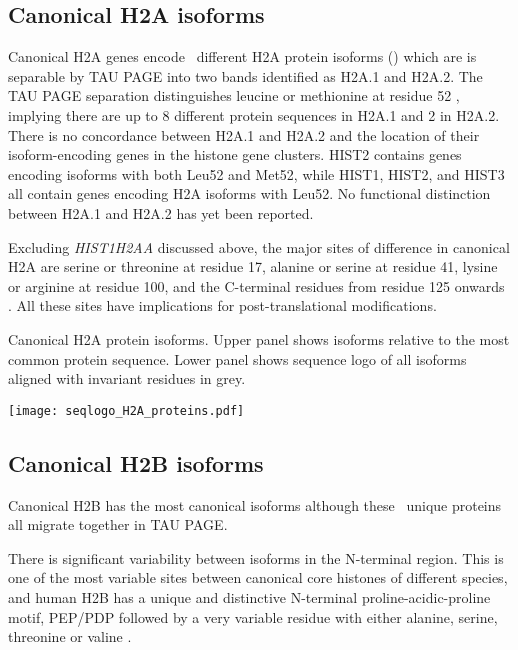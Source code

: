   \subsection{Canonical H2A isoforms}
    Canonical H2A genes encode \HTwoAUniqueProteins{}~different H2A
    protein isoforms ()
    which are is separable by TAU PAGE into two bands identified as H2A.1 and H2A.2.
    The TAU PAGE separation distinguishes leucine or methionine at
    residue 52 \citep{FranklinZweidler1977,Zweidler1977},
    implying there are up to 8 different protein sequences in H2A.1 and 2 in H2A.2.
    There is no concordance between H2A.1 and H2A.2
    and the location of their isoform-encoding genes in the histone gene clusters.
    HIST2 contains genes encoding isoforms with both Leu52 and Met52,
    while HIST1, HIST2, and HIST3 all contain genes encoding H2A isoforms with Leu52.
    No functional distinction between H2A.1 and H2A.2 has yet been reported.

    Excluding \textit{HIST1H2AA} discussed above,
    the major sites of difference in canonical H2A are
    serine or threonine at residue 17,
    alanine or serine at residue 41,
    lysine or arginine at residue 100,
    and the C-terminal residues from residue 125 onwards .
    All these sites have implications for post-translational modifications.

    \begin{table}
      \caption{
        Canonical H2A protein isoforms.  Upper panel shows isoforms
        relative to the most common protein sequence.  Lower panel
        shows sequence logo of all isoforms aligned with invariant
        residues in grey.
      }
      \label{tab:H2A-consensus}
      
      \texttt{[image: seqlogo\_H2A\_proteins.pdf]}
    \end{table}

  \subsection{Canonical H2B isoforms}
    Canonical H2B has the most canonical isoforms 
    although these \HTwoBUniqueProteins{}~unique proteins all migrate together in TAU PAGE.

    There is significant variability between isoforms in the N-terminal region.
    This is one of the most variable sites between canonical
    core histones of different species, and
    human H2B has a unique and distinctive N-terminal proline-acidic-proline motif, PEP/PDP
    followed by a very variable residue with either alanine, serine,
    threonine or valine .

